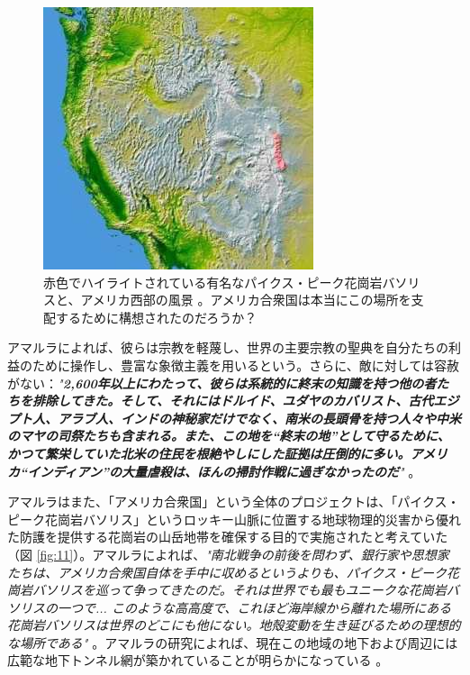 \documentclass[10pt,twocolumn,letterpaper]{article}
\begin{document}
\begin{figure}[t]
\begin{center}
   \includegraphics[width=1\linewidth]{pike.jpg}
\end{center}
   \caption{赤色でハイライトされている有名なパイクス・ピーク花崗岩バソリスと、アメリカ西部の風景 \cite{36}。アメリカ合衆国は本当にこの場所を支配するために構想されたのだろうか？}
\label{fig:11}
\label{fig:onecol}
\end{figure}

アマルラによれば、彼らは宗教を軽蔑し、世界の主要宗教の聖典を自分たちの利益のために操作し、豊富な象徴主義を用いるという。さらに、敵に対しては容赦がない：\textit{"\textbf{2,600年以上にわたって、彼らは系統的に終末の知識を持つ他の者たちを排除してきた。そして、それにはドルイド、ユダヤのカバリスト、古代エジプト人、アラブ人、インドの神秘家だけでなく、南米の長頭骨を持つ人々や中米のマヤの司祭たちも含まれる。また、この地を“終末の地”として守るために、かつて繁栄していた北米の住民を根絶やしにした証拠は圧倒的に多い。アメリカ“インディアン”の大量虐殺は、ほんの掃討作戦に過ぎなかったのだ}"} \cite{33,34}。

アマルラはまた、「アメリカ合衆国」という全体のプロジェクトは、「パイクス・ピーク花崗岩バソリス」というロッキー山脈に位置する地球物理的災害から優れた防護を提供する花崗岩の山岳地帯を確保する目的で実施されたと考えていた（図 \ref{fig:11}）。アマルラによれば、\textit{"南北戦争の前後を問わず、銀行家や思想家たちは、アメリカ合衆国自体を手中に収めるというよりも、パイクス・ピーク花崗岩バソリスを巡って争ってきたのだ。それは世界でも最もユニークな花崗岩バソリスの一つで... このような高高度で、これほど海岸線から離れた場所にある花崗岩バソリスは世界のどこにも他にない。地殻変動を生き延びるための理想的な場所である"} \cite{33,34}。アマルラの研究によれば、現在この地域の地下および周辺には広範な地下トンネル網が築かれていることが明らかになっている \cite{36}。
\end{document}
